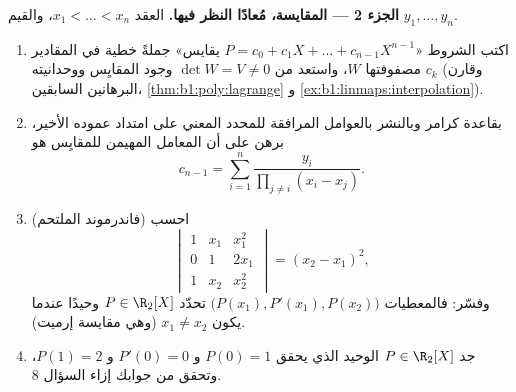 \begin{problem}
\medskip
\noindent\textbf{الجزء 2 --- المقايسة، مُعادًا النظر فيها.} العقد
$x_1 < \dots < x_n$، والقيم $y_1, \dots, y_n$.
\begin{enumerate}[resume]
  \item اكتب الشروط «$P = c_0 + c_1X + \dots +
        c_{n-1}X^{n-1}$ يقايس» جملةً خطية في
        المقادير $c_k$ مصفوفتها $W$، واستعد من $\det W = V \neq
        0$ وجود المقايِس ووحدانيته
        (وقارن البرهانين السابقين،
        \cref{thm:b1:poly:lagrange} و
        \cref{ex:b1:linmaps:interpolation}).
  \item بقاعدة كرامر وبالنشر بالعوامل المرافقة للمحدد المعني
        على امتداد عموده الأخير، برهن على أن
        المعامل المهيمن للمقايِس هو
        \[
        c_{n-1} = \sum_{i=1}^{n}
        \frac{y_i}{\prod_{j \neq i}(x_i - x_j)} .
        \]
  \item (فاندرموند الملتحم) احسب
        \[
        \begin{vmatrix}
        1 & x_1 & x_1^2\\
        0 & 1 & 2x_1\\
        1 & x_2 & x_2^2
        \end{vmatrix}
        = (x_2 - x_1)^2 ,
        \]
        وفسّر: فالمعطيات $\bigl(P(x_1), P'(x_1),
        P(x_2)\bigr)$ تحدّد $P \in \R_2[X]$ وحيدًا عندما يكون
        $x_1 \neq x_2$ (وهي مقايسة إرميت).
  \item جد $P \in \R_2[X]$ الوحيد الذي يحقق $P(0) = 1$ و $P'(0)
        = 0$ و $P(1) = 2$، وتحقق من جوابك إزاء
        السؤال 8.
\end{enumerate}


\end{problem}
